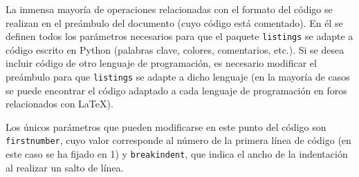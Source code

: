 La inmensa mayoría de operaciones relacionadas con el formato del código se realizan en el preámbulo del documento (cuyo código está comentado). En él se definen todos los parámetros necesarios para que el paquete \texttt{listings} se adapte a código escrito en Python (palabras clave, colores, comentarios, etc.). Si se desea incluir código de otro lenguaje de programación, es necesario modificar el preámbulo para que \texttt{listings} se adapte a dicho lenguaje (en la mayoría de casos se puede encontrar el código adaptado a cada lenguaje de programación en foros relacionados con \LaTeX).

Los únicos parámetros que pueden modificarse en este punto del código son \texttt{firstnumber}, cuyo valor corresponde al número de la primera línea de código (en este caso se ha fijado en 1) y \texttt{breakindent}, que indica el ancho de la indentación al realizar un salto de línea.

